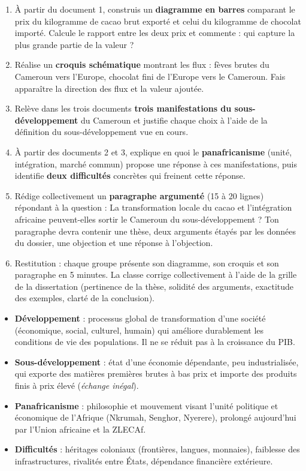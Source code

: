 \documentclass[11pt]{article}
\newcounter{popsec}
\newcounter{popsub}
\newcommand{\courssub}[1]{%
  \stepcounter{popsub}%
  \par\vspace{9pt}\noindent{\popxbold\fontsize{11.5}{13}\selectfont\color{popink}{\color{poporange}\thepopsec.\thepopsub}\hspace{6pt}#1}\par\nopagebreak\vspace{4pt}
}
\begin{document}
\begin{enumerate}
\item À partir du document 1, construis un \textbf{diagramme en barres} comparant le prix du kilogramme de cacao brut exporté et celui du kilogramme de chocolat importé. Calcule le rapport entre les deux prix et commente : qui capture la plus grande partie de la valeur ?
\item Réalise un \textbf{croquis schématique} montrant les flux : fèves brutes du Cameroun vers l'Europe, chocolat fini de l'Europe vers le Cameroun. Fais apparaître la direction des flux et la valeur ajoutée.
\item Relève dans les trois documents \textbf{trois manifestations du sous-développement} du Cameroun et justifie chaque choix à l'aide de la définition du sous-développement vue en cours.
\item À partir des documents 2 et 3, explique en quoi le \textbf{panafricanisme} (unité, intégration, marché commun) propose une réponse à ces manifestations, puis identifie \textbf{deux difficultés} concrètes qui freinent cette réponse.
\item Rédige collectivement un \textbf{paragraphe argumenté} (15 à 20 lignes) répondant à la question : \og La transformation locale du cacao et l'intégration africaine peuvent-elles sortir le Cameroun du sous-développement ? \fg{} Ton paragraphe devra contenir une thèse, deux arguments étayés par les données du dossier, une objection et une réponse à l'objection.
\item Restitution : chaque groupe présente son diagramme, son croquis et son paragraphe en 5 minutes. La classe corrige collectivement à l'aide de la grille de la dissertation (pertinence de la thèse, solidité des arguments, exactitude des exemples, clarté de la conclusion).
\end{enumerate}

\courssub{Ressources à mobiliser}

\begin{aretenir}
\begin{itemize}
\item \textbf{Développement} : processus global de transformation d'une société (économique, social, culturel, humain) qui améliore durablement les conditions de vie des populations. Il ne se réduit pas à la croissance du PIB.
\item \textbf{Sous-développement} : état d'une économie dépendante, peu industrialisée, qui exporte des matières premières brutes à bas prix et importe des produits finis à prix élevé (\emph{échange inégal}).
\item \textbf{Panafricanisme} : philosophie et mouvement visant l'unité politique et économique de l'Afrique (Nkrumah, Senghor, Nyerere), prolongé aujourd'hui par l'Union africaine et la ZLECAf.
\item \textbf{Difficultés} : héritages coloniaux (frontières, langues, monnaies), faiblesse des infrastructures, rivalités entre États, dépendance financière extérieure.
\end{itemize}
\end{aretenir}
\end{document}
